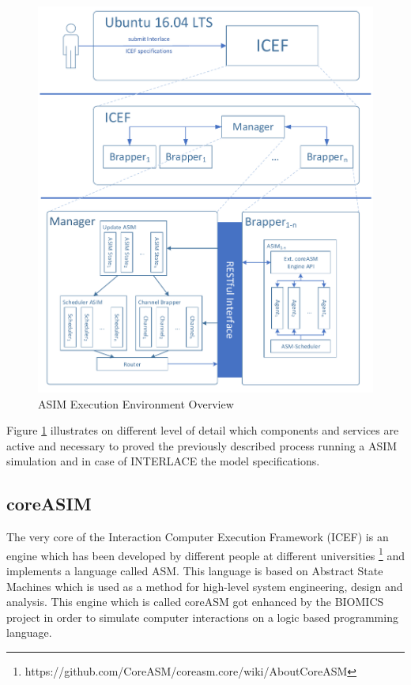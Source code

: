 \begin{figure}[htbp]
  \centering
  \includegraphics[width=1.0\textwidth, clip, trim=1mm 1mm 1mm 1mm]{Figures/environment_asim}
  \caption{ASIM Execution Environment Overview}
  \label{fig:icef-intro-asim}
\end{figure}

Figure \ref{fig:icef-intro-asim} illustrates on different level of detail which components and services are active and necessary to proved the previously described process running a ASIM simulation and in case of INTERLACE the model specifications.

\subsection{coreASIM}
\label{sec:coreasim-details}

The very core of the Interaction Computer Execution Framework (ICEF) is an engine which has been developed by different people at different universities \footnote{https://github.com/CoreASM/coreasm.core/wiki/About\-CoreASM} and implements a language called ASM. This language is based on Abstract State Machines \cite{BoergerStaerk2003} which is used as a method for high-level system engineering, design and analysis. This engine which is called coreASM got enhanced by the BIOMICS project in order to simulate computer interactions on a logic based programming language.

